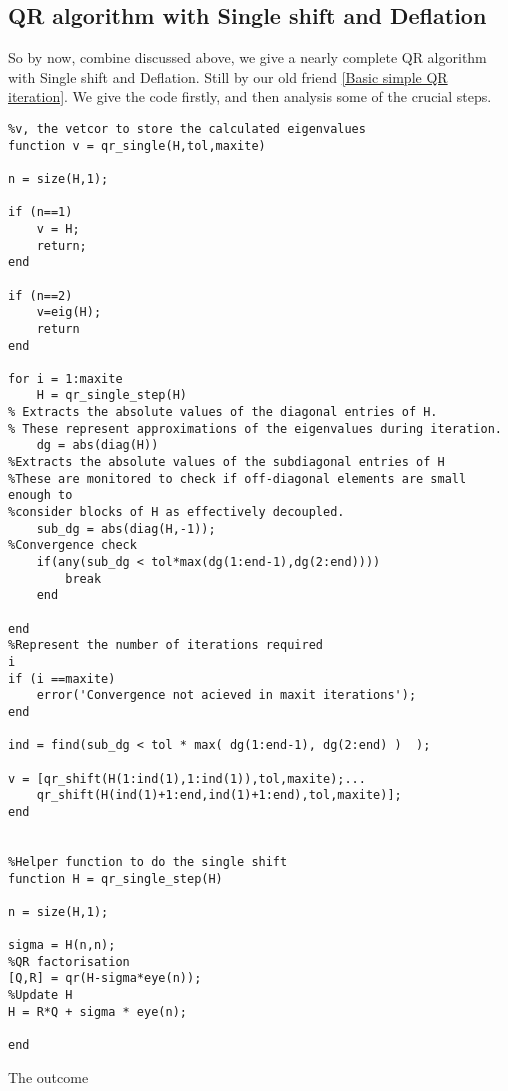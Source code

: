 \subsection{QR algorithm with Single shift and Deflation}
So by now, combine discussed above, we give a nearly complete QR algorithm with Single shift and Deflation. Still by our old friend \ref{Basic simple QR iteration}. We give the code firstly, and then analysis some of the crucial steps.
\begin{verbatim}
%v, the vetcor to store the calculated eigenvalues
function v = qr_single(H,tol,maxite)

n = size(H,1);

if (n==1)
    v = H;
    return;
end

if (n==2)
    v=eig(H);
    return
end

for i = 1:maxite
    H = qr_single_step(H)
% Extracts the absolute values of the diagonal entries of H.
% These represent approximations of the eigenvalues during iteration.
    dg = abs(diag(H))
%Extracts the absolute values of the subdiagonal entries of H 
%These are monitored to check if off-diagonal elements are small enough to 
%consider blocks of H as effectively decoupled.
    sub_dg = abs(diag(H,-1));
%Convergence check
    if(any(sub_dg < tol*max(dg(1:end-1),dg(2:end))))
        break
    end

end
%Represent the number of iterations required
i
if (i ==maxite)
    error('Convergence not acieved in maxit iterations');
end

ind = find(sub_dg < tol * max( dg(1:end-1), dg(2:end) )  );

v = [qr_shift(H(1:ind(1),1:ind(1)),tol,maxite);...
    qr_shift(H(ind(1)+1:end,ind(1)+1:end),tol,maxite)];
end


%Helper function to do the single shift
function H = qr_single_step(H)

n = size(H,1);

sigma = H(n,n);
%QR factorisation
[Q,R] = qr(H-sigma*eye(n));
%Update H
H = R*Q + sigma * eye(n);

end
\end{verbatim}
The outcome
